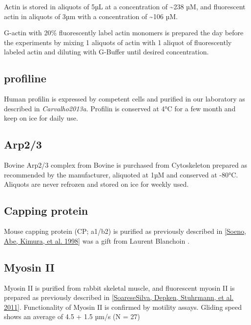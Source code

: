\documentclass[A4paperpaper,11pt,english]{sphinxmanual}
\begin{document}
Actin is stored in aliquots of 5µL at a concentration of \textasciitilde{}238 µM, and
fluorescent actin in aliquots of 3µm with a concentration of \textasciitilde{}106 µM.

G-actin with 20\% fluorescently label actin  monomers is prepared the day before
the experiments by mixing 1 aliquots of actin with 1 aliquot of fluorescently
labeled actin and diluting with G-Buffer until desired concentration.


\subsection{profiline}
\label{parts/part2:profiline}
Human profilin is expressed by competent cells and purified in our laboratory as
described in \emph{Carvalho2013a}.  Profilin is conserved at 4°C for a few month and
keep on ice for daily use.


\subsection{Arp2/3}
\label{parts/part2:arp2-3}
Bovine Arp2/3 complex  from Bovine is purchased from Cytoskeleton prepared as recommended by the manufacturer, aliquoted at 1µM
and conserved at -80°C.  Aliquots are never refrozen and stored on ice for
weekly used.


\subsection{Capping protein}
\label{parts/part2:capping-protein}
Mouse capping protein (CP; a1/b2) is purified as previously described in {\hyperref[parts/part2:soeno1998]{{[}Soeno, Abe, Kimura,  et al.  1998{]}}} was a gift from Laurent Blanchoin .


\subsection{Myosin II}
\label{parts/part2:myosin-ii}
Myosin II is purified from rabbit skeletal muscle, and fluorescent myosin II is
prepared as previously described in {\hyperref[parts/part2:soaresesilva2011]{{[}SoareseSilva, Depken, Stuhrmann,  et al.  2011{]}}}. Functionality of
Myosin II is confirmed by motility assays. Gliding speed shows an average of 4.5
+ 1.5 µm/s (N = 27)
\end{document}
